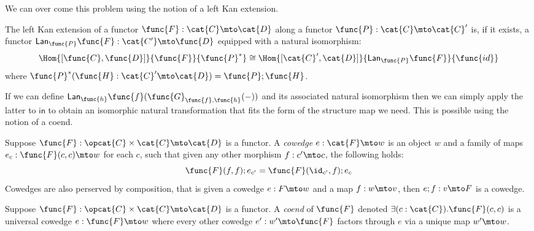 We can over come this problem using the notion of a left Kan
extension. 
\newcommand{\Lan}[2]{\mathsf{Lan}_{#1}#2}
\begin{definition}
\label{def:left_kan_extension}
The left Kan extension of a functor $\func{F} : \cat{C} \mto \cat{D}$
along a functor $\func{P} : \cat{C} \mto \cat{C}'$ is, if it exists, a
functor $\Lan{\func{P}}{\func{F}} : \cat{C'} \mto \func{D}$ equipped
with a natural isomorphism:
\[
    \Hom{[\func{C},\func{D}]}{\func{F}}{\func{P}^*} \cong \Hom{[\cat{C}',\cat{D}]}{\Lan{\func{P}}{\func{F}}}{\func{id}}
\]
where $\func{P}^*(\func{H} : \cat{C}' \mto \cat{D}) = \func{P};\func{H}$.
\end{definition}
\noindent
If we can define
$\Lan{\func{h}}{\func{f}(\func{G}_{\func{f},\func{h}}(-))}$ and its
associated natural isomorphism then we can simply apply the latter to
$\mathsf{in}$ to obtain an isomorphic natural transformation that fits
the form of the structure map we need. This is possible using the
notion of a coend.
\begin{definition}[Cowedge]
\label{def:cowedge}
Suppose $\func{F} : \opcat{C} \times \cat{C} \mto \cat{D}$ is a
functor. A \emph{cowedge} $e : \cat{F} \mto w$ is an object $w$ and a
family of maps $e_c : \func{F}(c,c) \mto w$ for each $c$, such that
given any other morphism $f : c' \mto c$, the following holds:
\[
    \func{F}(f,f);e_{c'} = \func{F}(\id_{c'},f);e_{c}
\]
Cowedges are also perserved by composition, that is given a cowedge $e
: F \mto w$ and a map $f : w \mto v$, then $e;f : v \mto F$ is a
cowedge.
\end{definition}

\begin{definition}[Coend]
\label{def:coend}
Suppose $\func{F} : \opcat{C} \times \cat{C} \mto \cat{D}$ is a
functor. A \emph{coend} of $\func{F}$ denoted 
$\exists(c : \cat{C}).\func{F}(c,c)$ 
is a universal cowedge $e : \func{F} \mto w$ where every other cowedge $e' :
w' \mto \func{F}$ factors through $e$ via a unique map $w' \mto w$.
\end{definition}

